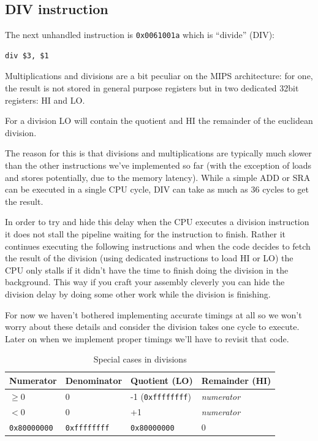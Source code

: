 \documentclass[a4paper]{article}
\newcommand{\code}[1] {\texttt{#1}}
\begin{document}
\subsection{DIV instruction}

The next unhandled instruction is \code{0x0061001a} which is
``divide'' (DIV):

\begin{lstlisting}[language=assembly]
div $3, $1
\end{lstlisting}

Multiplications and divisions are a bit peculiar on the MIPS
architecture: for one, the result is not stored in general purpose
registers but in two dedicated 32bit registers: HI and LO.

For a division LO will contain the quotient and HI the remainder of
the euclidean division.

The reason for this is that divisions and multiplications are
typically much slower than the other instructions we've implemented so
far (with the exception of loads and stores potentially, due to the
memory latency). While a simple ADD or SRA can be executed in a single
CPU cycle, DIV can take as much as 36 cycles to get the result.

In order to try and hide this delay when the CPU executes a division
instruction it does not stall the pipeline waiting for the instruction
to finish. Rather it continues executing the following instructions
and when the code decides to fetch the result of the division (using
dedicated instructions to load HI or LO) the CPU only stalls if it
didn't have the time to finish doing the division in the
background. This way if you craft your assembly cleverly you can hide
the division delay by doing some other work while the division is
finishing.

For now we haven't bothered implementing accurate timings at all so we
won't worry about these details and consider the division takes one
cycle to execute. Later on when we implement proper timings we'll have
to revisit that code.

\begin{table}[ht]
  \centering

  \begin{tabular}{ l | l | l | l }
    Numerator         & Denominator       & Quotient (LO)
    & Remainder (HI)\\
    \hline
    $ \ge 0 $         & 0                 & -1 (\code{0xffffffff})
    & \textit{numerator} \\
    $ < 0 $           & 0                 & +1
    & \textit{numerator} \\
    \code{0x80000000} & \code{0xffffffff} & \code{0x80000000}
    & 0 \\
  \end{tabular}

  \caption{Special cases in divisions}
  \label{tab:divspecial}
\end{table}
\end{document}
